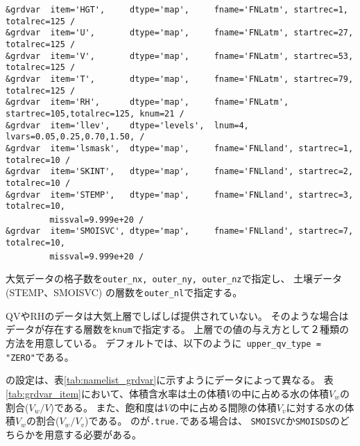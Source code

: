 {\verb|&grdvar  item='HGT',     dtype='map',     fname='FNLatm', startrec=1,  totalrec=125 / |  \\
\verb|&grdvar  item='U',       dtype='map',     fname='FNLatm', startrec=27, totalrec=125 / |  \\
\verb|&grdvar  item='V',       dtype='map',     fname='FNLatm', startrec=53, totalrec=125 / |  \\
\verb|&grdvar  item='T',       dtype='map',     fname='FNLatm', startrec=79, totalrec=125 / |  \\
\verb|&grdvar  item='RH',      dtype='map',     fname='FNLatm', startrec=105,totalrec=125, knum=21 /  |  \\
\verb|&grdvar  item='llev',    dtype='levels',  lnum=4, lvars=0.05,0.25,0.70,1.50, /        |  \\
\verb|&grdvar  item='lsmask',  dtype='map',     fname='FNLland', startrec=1, totalrec=10 /  |  \\
\verb|&grdvar  item='SKINT',   dtype='map',     fname='FNLland', startrec=2, totalrec=10 /  |  \\
\verb|&grdvar  item='STEMP',   dtype='map',     fname='FNLland', startrec=3, totalrec=10,|\\
~~~~~~~~\verb| missval=9.999e+20 /|  \\
\verb|&grdvar  item='SMOISVC', dtype='map',     fname='FNLland', startrec=7, totalrec=10,|\\
~~~~~~~~\verb| missval=9.999e+20 /|  \\
}

大気データの格子数を\verb|outer_nx, outer_ny, outer_nz|で指定し、
土壌データ(STEMP、SMOISVC) の層数を\verb|outer_nl|で指定する。

QVやRHのデータは大気上層でしばしば提供されていない。
そのような場合はデータが存在する層数を\verb|knum|で指定する。
上層での値の与え方として２種類の方法を用意している。
デフォルトでは、以下のように\verb| upper_qv_type = "ZERO"|である。\\

の設定は、表\ref{tab:namelist_grdvar}に示すようにデータによって異なる。
表\ref{tab:grdvar_item}において、体積含水率は土の体積$V$の中に占める水の体積$V_w$の割合($V_w / V$)である。
また、飽和度は$V$の中に占める間隙の体積$V_v$に対する水の体積$V_w$の割合($V_w / V_v$)である。
のが\verb|.true.|である場合は、
\verb|SMOISVC|か\verb|SMOISDS|のどちらかを用意する必要がある。

